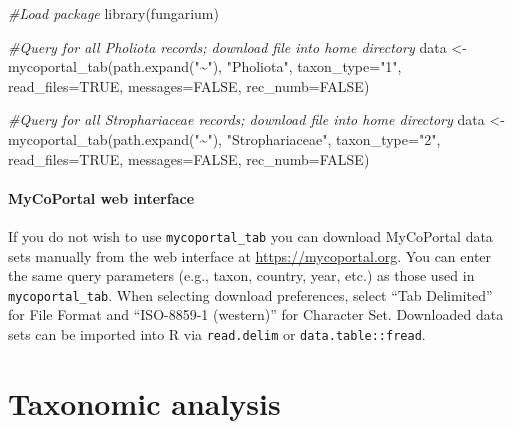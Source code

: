 \documentclass[
]{book}
\newenvironment{Shaded}{\begin{snugshade}}{\end{snugshade}}
\newcommand{\AttributeTok}[1]{\textcolor[rgb]{0.77,0.63,0.00}{#1}}
\newcommand{\CommentTok}[1]{\textcolor[rgb]{0.56,0.35,0.01}{\textit{#1}}}
\newcommand{\ConstantTok}[1]{\textcolor[rgb]{0.00,0.00,0.00}{#1}}
\newcommand{\FunctionTok}[1]{\textcolor[rgb]{0.00,0.00,0.00}{#1}}
\newcommand{\NormalTok}[1]{#1}
\newcommand{\OtherTok}[1]{\textcolor[rgb]{0.56,0.35,0.01}{#1}}
\newcommand{\StringTok}[1]{\textcolor[rgb]{0.31,0.60,0.02}{#1}}
\begin{document}
\begin{Shaded}
\begin{Highlighting}[]
\CommentTok{\#Load package}
\FunctionTok{library}\NormalTok{(fungarium) }

\CommentTok{\#Query for all Pholiota records; download file into home directory}
\NormalTok{data }\OtherTok{\textless{}{-}} \FunctionTok{mycoportal\_tab}\NormalTok{(}\FunctionTok{path.expand}\NormalTok{(}\StringTok{"\textasciitilde{}"}\NormalTok{), }\StringTok{"Pholiota"}\NormalTok{,}
                            \AttributeTok{taxon\_type=}\StringTok{"1"}\NormalTok{, }\AttributeTok{read\_files=}\ConstantTok{TRUE}\NormalTok{,}
                            \AttributeTok{messages=}\ConstantTok{FALSE}\NormalTok{, }\AttributeTok{rec\_numb=}\ConstantTok{FALSE}\NormalTok{)}

\CommentTok{\#Query for all Strophariaceae records; download file into home directory}
\NormalTok{data }\OtherTok{\textless{}{-}} \FunctionTok{mycoportal\_tab}\NormalTok{(}\FunctionTok{path.expand}\NormalTok{(}\StringTok{"\textasciitilde{}"}\NormalTok{), }\StringTok{"Strophariaceae"}\NormalTok{,}
                            \AttributeTok{taxon\_type=}\StringTok{"2"}\NormalTok{, }\AttributeTok{read\_files=}\ConstantTok{TRUE}\NormalTok{,}
                            \AttributeTok{messages=}\ConstantTok{FALSE}\NormalTok{, }\AttributeTok{rec\_numb=}\ConstantTok{FALSE}\NormalTok{)}
\end{Highlighting}
\end{Shaded}

\hypertarget{mycoportal-web-interface}{%
\subsubsection{MyCoPortal web interface}\label{mycoportal-web-interface}}

If you do not wish to use \texttt{mycoportal\_tab} you can download MyCoPortal data sets manually from the web interface at \url{https://mycoportal.org}. You can enter the same query parameters (e.g., taxon, country, year, etc.) as those used in \texttt{mycoportal\_tab}. When selecting download preferences, select ``Tab Delimited'' for File Format and ``ISO-8859-1 (western)'' for Character Set. Downloaded data sets can be imported into R via \texttt{read.delim} or \texttt{data.table::fread}.

\hypertarget{tax}{%
\chapter{Taxonomic analysis}\label{tax}}
\end{document}
